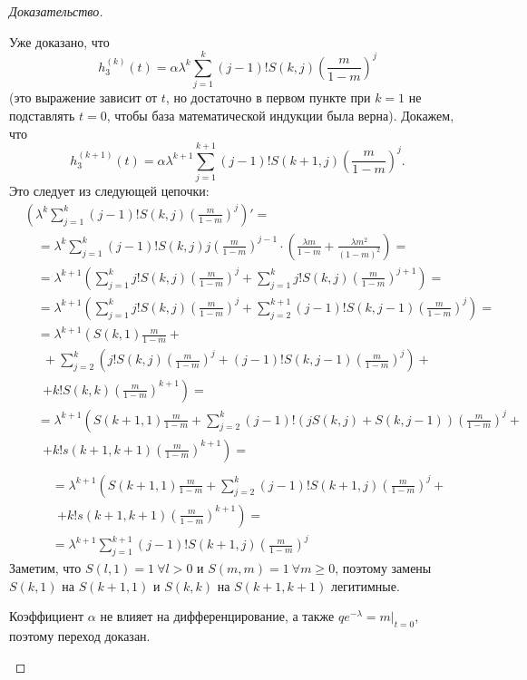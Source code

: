 \documentclass[12pt, specialist, subf, substylefile = spbu_report.rtx]{disser}
\begin{document}
\begin{proof}[Доказательство]
\begin{enumerate}
			Уже доказано, что
			\[
				h _3 ^{(k)} (t) = \alpha \lambda ^k \sum \limits _{j = 1} ^{k} (j - 1)! S(k, j) \left(\frac m {1 - m}\right) ^j
			\]
			(это выражение зависит от $t$, но достаточно в первом пункте при $k = 1$ не подставлять $t = 0$, чтобы база математической индукции была верна). Докажем, что
			\[
				h _3 ^{(k + 1)} (t) = \alpha \lambda ^{k + 1} \sum \limits _{j = 1} ^{k + 1} (j - 1)! S(k + 1, j) \left(\frac m {1 - m}\right) ^j.
			\]
			Это следует из следующей цепочки:
			\[
				\begin{aligned}
					&\left(\lambda ^k \sum \limits _{j = 1} ^{k} (j - 1)! S(k, j) \left(\frac m {1 - m}\right) ^j\right)' =\\
					&\quad= \lambda ^k \sum \limits _{j = 1} ^{k} (j - 1)! S(k, j) j \left(\frac m {1 - m}\right) ^{j - 1} \cdot \left(\frac {\lambda m} {1 - m} + \frac {\lambda m ^2} {(1 - m) ^2}\right) =\\
					&\quad= \lambda ^{k + 1} \left(\sum \limits _{j = 1} ^{k} j! S(k, j) \left(\frac m {1 - m}\right) ^j + \sum \limits _{j = 1} ^{k} j! S(k, j) \left(\frac m {1 - m}\right) ^{j + 1}\right) =\\
					&\quad= \lambda ^{k + 1} \left(\sum \limits _{j = 1} ^{k} j! S(k, j) \left(\frac m {1 - m}\right) ^j + \sum \limits _{j = 2} ^{k + 1} (j - 1)! S(k, j - 1) \left(\frac m {1 - m}\right) ^j\right) =\\
					&\quad= \lambda ^{k + 1} \left(S(k, 1) \frac m {1 - m} +\right.\\
					&\quad~~ + \sum \limits _{j = 2} ^{k} \left(j! S(k, j) \left(\frac m {1 - m}\right) ^j + (j - 1)! S(k, j - 1) \left(\frac m {1 - m}\right) ^j\right) +\\
					&\quad~~ \left.+ k ! S (k, k) \left(\frac m {1 - m}\right) ^{k + 1}\right) =\\
					&\quad= \lambda ^{k + 1} \left(S(k + 1, 1) \frac m {1 - m} + \sum \limits _{j = 2} ^{k} (j - 1)! \left(j S(k, j) + S(k, j - 1)\right) \left(\frac m {1 - m}\right) ^j +\right.\\
					&\quad~~\left.+ k ! s (k + 1, k + 1) \left(\frac m {1 - m}\right) ^{k + 1}\right) =\\
				\end{aligned}
			\]
			\[
				\begin{aligned}
					&\quad= \lambda ^{k + 1} \left(S(k + 1, 1) \frac m {1 - m} + \sum \limits _{j = 2} ^{k} (j - 1)! S(k + 1, j) \left(\frac m {1 - m}\right) ^j +\right.\\
					&\quad~~\left.+ k ! s (k + 1, k + 1) \left(\frac m {1 - m}\right) ^{k + 1}\right) =\\
					&\quad=\lambda ^{k + 1} \sum \limits _{j = 1} ^{k + 1} (j - 1)! S(k + 1, j) \left(\frac m {1 - m}\right) ^j
				\end{aligned}
			\]
			Заметим, что $S(l, 1) = 1~ \forall l > 0$ и $S(m, m) = 1~ \forall m \geqslant 0$, поэтому замены $S(k, 1)$ на $S(k + 1, 1)$ и $S(k, k)$ на $S(k + 1, k + 1)$ легитимные.
			
			Коэффициент $\alpha$ не влияет на дифференцирование, а также $q e ^{-\lambda} = m | _{t = 0}$, поэтому переход доказан.
		\end{enumerate}
	\end{proof}
\end{document}
